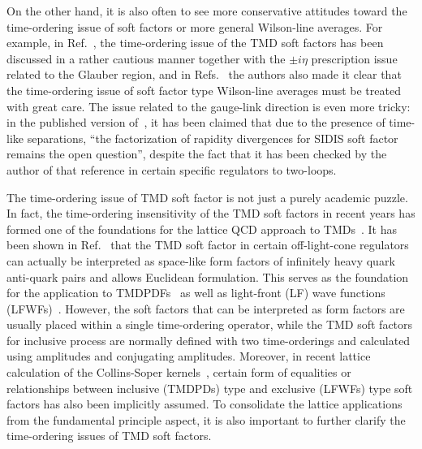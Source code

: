 \documentclass[a4paper,11pt]{article}
\begin{document}
On the other hand, it is also often to see more conservative attitudes toward the time-ordering issue of soft factors or more general Wilson-line averages. For example, in Ref.~\cite{Moult:2018jzp}, the time-ordering issue of the TMD soft factors has been discussed in a rather cautious manner together with the $\pm i\eta$ prescription issue related to the Glauber region, and in Refs.~\cite{Stewart:2009yx, Kang:2015moa} the authors also made it clear that the time-ordering issue of soft factor type Wilson-line averages must be treated with great care. The issue related to the gauge-link direction is even more tricky: in the published version of~\cite{Vladimirov:2017ksc}, it has been claimed that due to the presence of time-like separations, ``the factorization of rapidity divergences for SIDIS soft factor remains the open question'', despite the fact that it has been checked by the author of that reference in certain specific regulators to two-loops. 

The time-ordering issue of TMD soft factor is not just a purely academic puzzle. In fact, the time-ordering insensitivity of the TMD soft factors in recent years has formed one of the foundations for the lattice QCD approach to TMDs~\cite{Ji:2020ect}. It has been shown in Ref.~\cite{Ji:2019sxk,Ji:2020ect,Liu:2022nnk} that the TMD soft factor in certain off-light-cone regulators can actually be interpreted as  space-like form factors of infinitely heavy quark anti-quark pairs and allows Euclidean formulation. This serves as the foundation for the application to TMDPDFs~\cite{Ji:2019ewn} as well as light-front (LF) wave functions (LFWFs)~\cite{Ji:2021znw}. However, the soft factors that can be interpreted as form factors are usually placed within a single time-ordering operator, while the TMD soft factors for inclusive process are normally defined with two time-orderings and calculated using amplitudes and conjugating amplitudes. Moreover, in recent lattice calculation of the Collins-Soper kernels~\cite{LatticePartonLPC:2023pdv,Avkhadiev:2023poz}, certain form of equalities or relationships between inclusive (TMDPDs) type and exclusive (LFWFs) type soft factors has also been implicitly assumed. To consolidate the lattice applications from the fundamental principle aspect, it is also important to further clarify the time-ordering issues of TMD soft factors. 
\end{document}
